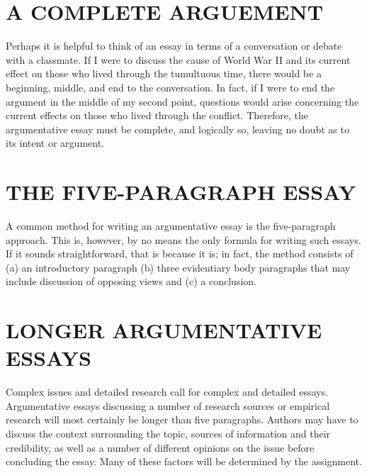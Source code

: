 \section{A COMPLETE ARGUEMENT}
	Perhaps it is helpful to think of an essay in terms of a conversation or debate with a classmate. If I were to discuss the cause of World War II and its current effect on those who lived through the tumultuous time, there would be a beginning, middle, and end to the conversation. In fact, if I were to end the argument in the middle of my second point, questions would arise concerning the current effects on those who lived through the conflict. Therefore, the argumentative essay must be complete, and logically so, leaving no doubt as to its intent or argument.

\section{THE FIVE-PARAGRAPH ESSAY}
	A common method for writing an argumentative essay is the five-paragraph approach. This is, however, by no means the only formula for writing such essays. If it sounds straightforward, that is because it is; in fact, the method consists of (a) an introductory paragraph (b) three evidentiary body paragraphs that may include discussion of opposing views and (c) a conclusion.

\section{LONGER ARGUMENTATIVE ESSAYS}
	Complex issues and detailed research call for complex and detailed essays. Argumentative essays discussing a number of research sources or empirical research will most certainly be longer than five paragraphs. Authors may have to discuss the context surrounding the topic, sources of information and their credibility, as well as a number of different opinions on the issue before concluding the essay. Many of these factors will be determined by the assignment.


